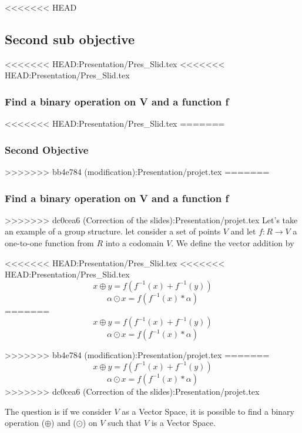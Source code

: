 \documentclass{beamer}
\begin{document}
\begin{frame}
\begin{frame}
\begin{frame}
\begin{frame}
\begin{frame}
\begin{frame}

    
\end{frame}
<<<<<<< HEAD
\subsection{Second sub objective}
\begin{frame}
<<<<<<< HEAD:Presentation/Pres_Slid.tex
<<<<<<< HEAD:Presentation/Pres_Slid.tex
    \frametitle{Find a binary operation on V and a function f }
<<<<<<< HEAD:Presentation/Pres_Slid.tex
=======
    \frametitle{Second Objective}
>>>>>>> bb4e784 (modification):Presentation/projet.tex
=======
    \frametitle{Find a binary operation on V and a function f }
>>>>>>> dc0cea6 (Correction of the slides):Presentation/projet.tex
	Let's take an example of a group structure.
	let consider a set of points  $ V $ and let  $ f: R \rightarrow V $ a one-to-one
	function from $R$ into a codomain $V$. We define the vector addition by
	
<<<<<<< HEAD:Presentation/Pres_Slid.tex
<<<<<<< HEAD:Presentation/Pres_Slid.tex
    $$ x \oplus y = f(f^{-1}(x) + f^{-1}(y)) $$
    $$ \alpha \odot x = f(f^{-1}(x) * \alpha) $$
=======
     $$ x \oplus y = f(f^{-1}(x) + f^{-1}(y)) $$
     $$ \alpha \odot x = f(f^{-1}(x) * \alpha) $$
		
>>>>>>> bb4e784 (modification):Presentation/projet.tex
=======
    $$ x \oplus y = f(f^{-1}(x) + f^{-1}(y)) $$
    $$ \alpha \odot x = f(f^{-1}(x) * \alpha) $$
>>>>>>> dc0cea6 (Correction of the slides):Presentation/projet.tex

	The question is if we consider $V$ as a Vector Space, it is possible to find a binary operation ($\oplus$) and ($\odot$) on $V$ such that $V$ is a Vector Space.
	

\end{frame}
\end{frame}
\end{frame}
\end{frame}
\end{frame}
\end{frame}
\end{document}
